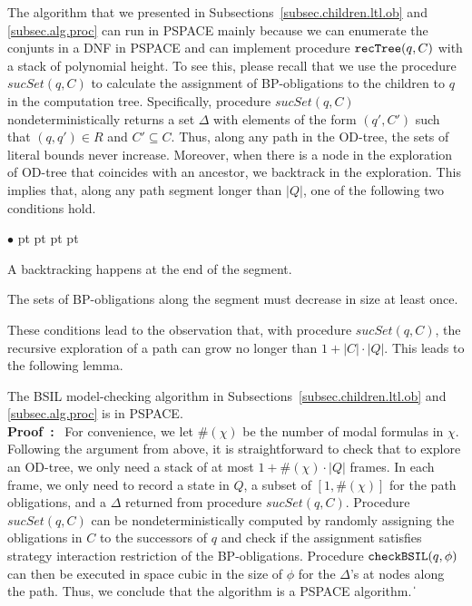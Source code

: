 \documentclass[11pt]{article}
\newcommand{\ttsynsuc}{\textit{sucSet}}
\newcommand{\ttchksil}{\mbox{\tt checkBSIL}}
\newcommand{\ttrecsyn}{\mbox{\tt recTree}}
\newcommand{\pf}{\noindent\mbox{\bf Proof : }}
\def\qed{\ifmmode\|\else{\unskip\nobreak\hfil
\penalty50\hskip1em\null\nobreak\hfil$\blacksquare$
\parfillskip=0pt\finalhyphendemerits=0\endgraf}\fi}
\newenvironment{list1}{\begin{list}{$\bullet$}
{\topsep 0 pt \parsep 0 pt \partopsep 0 pt \itemsep 0 pt}}{\end{list}}
\begin{document}
The algorithm that we presented in
Subsections~\ref{subsec.children.ltl.ob} and \ref{subsec.alg.proc}
can run in PSPACE mainly because we can 
enumerate the conjunts in a DNF in PSPACE and can implement procedure
$\ttrecsyn(q,C)$ with a stack of polynomial height. 
To see this, please recall that we use the procedure
$\ttsynsuc(q,C)$ to calculate the assignment of
BP-obligations to the children to $q$ in the computation tree. 
Specifically, procedure
$\ttsynsuc(q,C)$ nondeterministically returns a
set $\Delta$ with elements of the form $(q',C')$ such that
$(q,q')\in R$ and $C'\subseteq C$. 
Thus, along any path in the OD-tree, 
the sets of literal bounds never increase.  
Moreover, 
when there is a node in the exploration of OD-tree that coincides
with an ancestor, we backtrack in the exploration. This implies
that,
along any path segment longer than $|Q|$, one of the
following two conditions hold.
\begin{list1}
\item A backtracking happens at the end of the segment. 
\item The sets of BP-obligations along the segment must decrease in size at
	least once.
\end{list1}
These conditions lead to the observation that, with procedure
$\ttsynsuc(q,C)$, the recursive exploration of
a path can grow no longer than $1+|C|\cdot|Q|$. This
leads to the following lemma.

{\lemma \label{lemma.alg.pspace} The BSIL model-checking algorithm
in Subsections~\ref{subsec.children.ltl.ob} and
\ref{subsec.alg.proc} is in PSPACE.}
\\\pf 
For convenience, we let 
$\#(\chi)$ be the number of modal formulas in $\chi$.  
Following the argument from above,
it is straightforward to check that to explore an OD-tree, we only
need a stack of at most $1+\#(\chi)\cdot|Q|$ frames. 
In each frame, we only need to record a state in $Q$, a subset of
$[1,\#(\chi)]$ for the path obligations, and a $\Delta$
returned from procedure $\ttsynsuc(q,C)$.
Procedure $\ttsynsuc(q,C)$ can be
nondeterministically computed by randomly assigning the
obligations in $C$ to the successors of $q$ and check if the
assignment satisfies strategy interaction restriction of 
the BP-obligations.
Procedure $\ttchksil(q,\phi)$ can then be executed in space
cubic in the size of $\phi$ for the $\Delta$'s at nodes along the path. 
Thus, we conclude that the algorithm
is a PSPACE algorithm.  
\qed 
\end{document}
